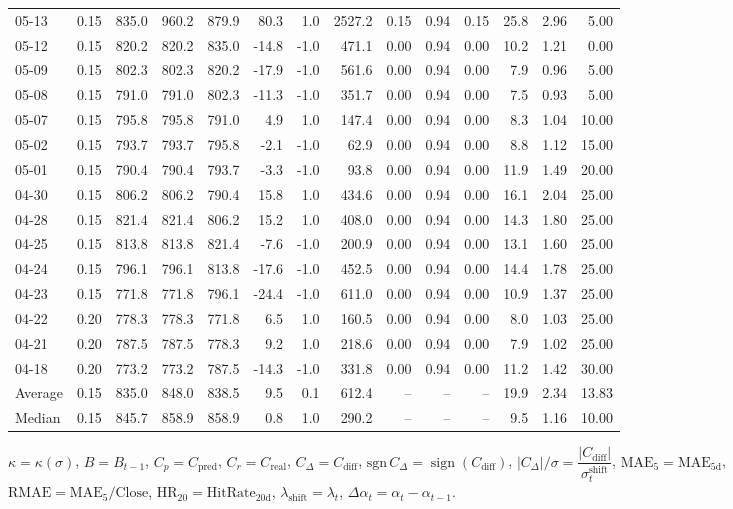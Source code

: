 \begin{threeparttable}
{\begin{tabular}{lrrrrrrrrrrrrr}
05-13 & 0.15 & 835.0 & 960.2 & 879.9 & 80.3 & 1.0 & 2527.2 & 0.15 & 0.94 & 0.15 & 25.8 & 2.96 & 5.00 \\
05-12 & 0.15 & 820.2 & 820.2 & 835.0 & -14.8 & -1.0 & 471.1 & 0.00 & 0.94 & 0.00 & 10.2 & 1.21 & 0.00 \\
05-09 & 0.15 & 802.3 & 802.3 & 820.2 & -17.9 & -1.0 & 561.6 & 0.00 & 0.94 & 0.00 & 7.9 & 0.96 & 5.00 \\
05-08 & 0.15 & 791.0 & 791.0 & 802.3 & -11.3 & -1.0 & 351.7 & 0.00 & 0.94 & 0.00 & 7.5 & 0.93 & 5.00 \\
05-07 & 0.15 & 795.8 & 795.8 & 791.0 & 4.9 & 1.0 & 147.4 & 0.00 & 0.94 & 0.00 & 8.3 & 1.04 & 10.00 \\
05-02 & 0.15 & 793.7 & 793.7 & 795.8 & -2.1 & -1.0 & 62.9 & 0.00 & 0.94 & 0.00 & 8.8 & 1.12 & 15.00 \\
05-01 & 0.15 & 790.4 & 790.4 & 793.7 & -3.3 & -1.0 & 93.8 & 0.00 & 0.94 & 0.00 & 11.9 & 1.49 & 20.00 \\
04-30 & 0.15 & 806.2 & 806.2 & 790.4 & 15.8 & 1.0 & 434.6 & 0.00 & 0.94 & 0.00 & 16.1 & 2.04 & 25.00 \\
04-28 & 0.15 & 821.4 & 821.4 & 806.2 & 15.2 & 1.0 & 408.0 & 0.00 & 0.94 & 0.00 & 14.3 & 1.80 & 25.00 \\
04-25 & 0.15 & 813.8 & 813.8 & 821.4 & -7.6 & -1.0 & 200.9 & 0.00 & 0.94 & 0.00 & 13.1 & 1.60 & 25.00 \\
04-24 & 0.15 & 796.1 & 796.1 & 813.8 & -17.6 & -1.0 & 452.5 & 0.00 & 0.94 & 0.00 & 14.4 & 1.78 & 25.00 \\
04-23 & 0.15 & 771.8 & 771.8 & 796.1 & -24.4 & -1.0 & 611.0 & 0.00 & 0.94 & 0.00 & 10.9 & 1.37 & 25.00 \\
04-22 & 0.20 & 778.3 & 778.3 & 771.8 & 6.5 & 1.0 & 160.5 & 0.00 & 0.94 & 0.00 & 8.0 & 1.03 & 25.00 \\
04-21 & 0.20 & 787.5 & 787.5 & 778.3 & 9.2 & 1.0 & 218.6 & 0.00 & 0.94 & 0.00 & 7.9 & 1.02 & 25.00 \\
04-18 & 0.20 & 773.2 & 773.2 & 787.5 & -14.3 & -1.0 & 331.8 & 0.00 & 0.94 & 0.00 & 11.2 & 1.42 & 30.00 \\
Average & 0.15 & 835.0 & 848.0 & 838.5 & 9.5 & 0.1 & 612.4 & -- & -- & -- & 19.9 & 2.34 & 13.83 \\
Median & 0.15 & 845.7 & 858.9 & 858.9 & 0.8 & 1.0 & 290.2 & -- & -- & -- & 9.5 & 1.16 & 10.00 \\
\bottomrule
\end{tabular}
}%
\begin{tablenotes}\footnotesize
\item $\kappa=\kappa(\sigma)$, $B=B_{t-1}$, $C_p=C_{\text{pred}}$, $C_r=C_{\text{real}}$, $C_\Delta=C_{\text{diff}}$, $\mathrm{sgn}\,C_\Delta=\operatorname{sign}(C_{\text{diff}})$, $|C_\Delta|/\sigma=\dfrac{|C_{\text{diff}}|}{\sigma_t^{\text{shift}}}$, $\mathrm{MAE}_5=\mathrm{MAE}_{5\text{d}}$, $\mathrm{RMAE}= \mathrm{MAE}_5 / \text{Close}$, $\mathrm{HR}_{20}=\mathrm{HitRate}_{20\text{d}}$, 
$\lambda_{\text{shift}}=\lambda_t$, 
$\Delta\alpha_t=\alpha_t-\alpha_{t-1}$.
\end{tablenotes}
\end{threeparttable}
\endgroup
